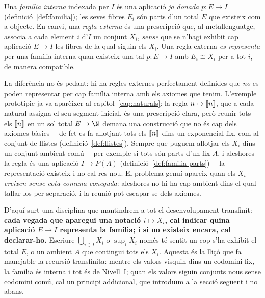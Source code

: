 \begin{definicio}\label{def:familia-vs-regla}
Una \emph{família interna} indexada per \(I\) és una aplicació \emph{ja
donada} \(p\colon E\to I\) (definició~\ref{def:familia}); les seves fibres
\(E_i\) són parts d'un total \(E\) que existeix com a objecte. En canvi, una
\emph{regla externa} és una prescripció que, al metallenguatge, associa a
cada element \(i\) d'\(I\) un conjunt \(X_i\), \emph{sense} que se n'hagi
exhibit cap aplicació \(E\to I\) les fibres de la qual siguin els \(X_i\).
Una regla externa \emph{es representa} per una família interna quan existeix
una tal \(p\colon E\to I\) amb \(E_i\cong X_i\) per a tot \(i\), de manera
compatible.
\end{definicio}

\begin{observacio}\label{obs:regla-externa-problema}
La diferència no és pedant: hi ha regles externes perfectament definides que
\emph{no} es poden representar per cap família interna amb els axiomes que
tenim. L'exemple prototípic ja va aparèixer al capítol~\ref{cap:naturals}: la
regla \(n\mapsto\llbracket n\rrbracket\), que a cada natural assigna el seu segment inicial,
és una prescripció clara, però reunir tots els \(\llbracket n\rrbracket\) en un sol total
\(E\to\N\) demana una construcció que no és cap dels axiomes bàsics ---de fet
es fa allotjant tots els \(\llbracket n\rrbracket\) dins un exponencial fix, com al
conjunt de llistes (definició~\ref{def:llistes}). Sempre que puguem allotjar
els \(X_i\) dins un conjunt ambient comú ---per exemple si tots són parts
d'un fix \(A\), i aleshores la regla és una aplicació \(I\to P(A)\)
(definició~\ref{def:familia-parts})--- la representació existeix i no cal res
nou. El problema genuí apareix quan els \(X_i\) \emph{creixen sense cota
comuna coneguda}: aleshores no hi ha cap ambient dins el qual tallar-los per
separació, i la reunió pot escapar-se dels axiomes.
\end{observacio}

\begin{observacio}\label{obs:regla-treball}
D'aquí surt una disciplina que mantindrem a tot el desenvolupament
transfinit: \textbf{cada vegada que aparegui una notació \(i\mapsto X_i\),
cal indicar quina aplicació \(E\to I\) representa la família; i si no
existeix encara, cal declarar-ho.} Escriure \(\bigcup_{i\in I}X_i\) o
\(\sup_i X_i\) només té sentit un cop s'ha exhibit el total \(E\), o un
ambient \(A\) que contingui tots els \(X_i\). Aquesta és la lliçó que fa
manejable la recursió transfinita: mentre els valors visquin dins un
codomini fix, la família és interna i tot és de Nivell~I; quan els valors
siguin conjunts nous sense codomini comú, cal un principi addicional, que
introduïm a la secció següent i no abans.
\end{observacio}

